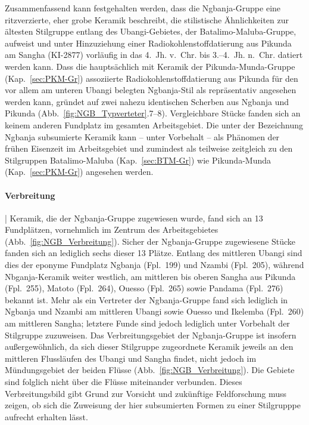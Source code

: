 Zusammenfassend kann festgehalten werden, dass die \mbox{Ngbanja}-Gruppe eine ritzverzierte, eher grobe Keramik beschreibt, die stilistische Ähnlichkeiten zur ältesten Stilgruppe entlang des \mbox{Ubangi}-Gebietes, der Batalimo-Maluba-Gruppe, aufweist und unter Hinzuziehung einer Radiokohlenstoffdatierung aus Pikunda am Sangha (KI-2877) vorläufig in das 4.~Jh. v.~Chr. bis 3.--4.~Jh. n.~Chr. datiert werden kann. Dass die hauptsächlich mit Keramik der Pikunda-Munda-Gruppe (Kap.~\ref{sec:PKM-Gr}) assoziierte Radiokohlenstoffdatierung aus Pikunda für den vor allem am unteren Ubangi belegten \mbox{Ngbanja}-Stil als repräsentativ angesehen werden kann, gründet auf zwei nahezu identischen Scherben aus Ngbanja und Pikunda (Abb.~\ref{fig:NGB_Typverteter}.7--8). Vergleichbare Stücke fanden sich an keinem anderen Fundplatz im gesamten Arbeitsgebiet. Die unter der Bezeichnung \mbox{Ngbanja} subsumierte Keramik kann -- unter Vorbehalt -- als Phänomen der frühen Eisenzeit im Arbeitsgebiet und zumindest als teilweise zeitgleich zu den Stilgruppen Batalimo-Maluba (Kap.~\ref{sec:BTM-Gr}) wie Pikunda-Munda (Kap.~\ref{sec:PKM-Gr}) angesehen werden.

\paragraph{Verbreitung}\hspace{-.5em}|\hspace{.5em}%
Keramik, die der \mbox{Ngbanja}-Gruppe zugewiesen wurde, fand sich an 13 Fundplätzen, vornehmlich im Zentrum des Arbeitsgebietes (Abb.~\ref{fig:NGB_Verbreitung}). Sicher der \mbox{Ngbanja}-Gruppe zugewiesene Stücke fanden sich an lediglich sechs dieser 13 Plätze. Entlang des mittleren \mbox{Ubangi} sind dies der eponyme Fundplatz \mbox{Ngbanja} (Fpl.~199) und Nzambi (Fpl.~205), während Nbganja-Keramik weiter westlich, am mittleren bis oberen \mbox{Sangha} aus Pikunda (Fpl.~255), Matoto (Fpl.~264), Ouesso (Fpl.~265) sowie Pandama (Fpl.~276) bekannt ist. Mehr als ein Vertreter der \mbox{Ngbanja}-Gruppe fand sich lediglich in \mbox{Ngbanja} und Nzambi am mittleren \mbox{Ubangi} sowie Ouesso und Ikelemba (Fpl.~260) am mittleren \mbox{Sangha}; letztere Funde sind jedoch lediglich unter Vorbehalt der Stilgruppe zuzuweisen. Das Verbreitungsgebiet der \mbox{Ngbanja}-Gruppe ist insofern außergewöhnlich, da sich dieser Stilgruppe zugeordnete Keramik jeweils an den mittleren Flussläufen des \mbox{Ubangi} und \mbox{Sangha} findet, nicht jedoch im Mündungsgebiet der beiden Flüsse (Abb.~\ref{fig:NGB_Verbreitung}). Die Gebiete sind folglich nicht über die Flüsse miteinander verbunden. Dieses Verbreitungsbild gibt Grund zur Vorsicht und zukünftige Feldforschung muss zeigen, ob sich die Zuweisung der hier subsumierten Formen zu einer Stilgrupppe aufrecht erhalten lässt.

